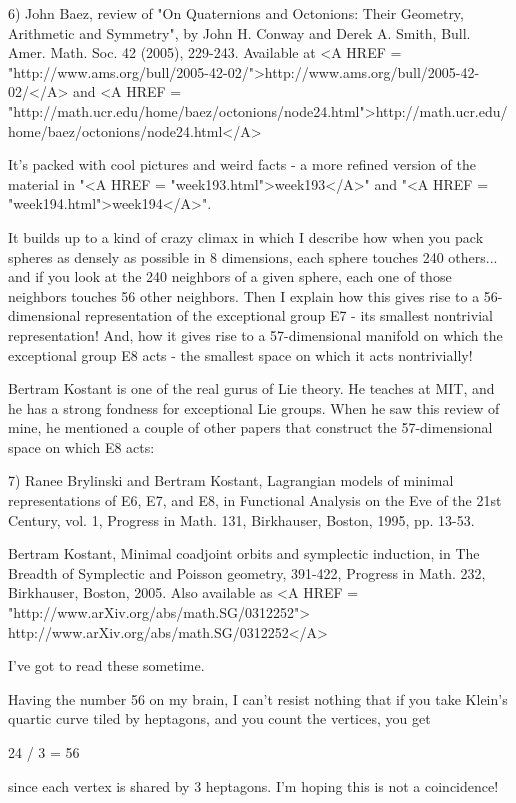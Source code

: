 6) John Baez, review of "On Quaternions and Octonions: Their Geometry,
Arithmetic and Symmetry", by John H. Conway and Derek A. Smith,
Bull. Amer. Math. Soc. 42 (2005), 229-243.  Available at 
<A HREF = "http://www.ams.org/bull/2005-42-02/">http://www.ams.org/bull/2005-42-02/</A> and 
<A HREF = "http://math.ucr.edu/home/baez/octonions/node24.html">http://math.ucr.edu/home/baez/octonions/node24.html</A>

It's packed with cool pictures and weird facts - a more refined
version of the material in "<A HREF = "week193.html">week193</A>" and "<A HREF = "week194.html">week194</A>".  

It builds up to a kind of crazy climax in which I describe how when you 
pack spheres as densely as possible in 8 dimensions, each sphere touches 
240 others... and if you look at the 240 neighbors of a given sphere, each 
one of those neighbors touches 56 other neighbors.  Then I explain how this 
gives rise to a 56-dimensional representation of the exceptional group E7 -
its smallest nontrivial representation!  And, how it
gives rise to a 57-dimensional manifold on which the exceptional group E8 
acts - the smallest space on which it acts nontrivially!   

Bertram Kostant is one of the real gurus of Lie theory.  He teaches at
MIT, and he has a strong fondness for exceptional Lie groups.  When he saw 
this review of mine, he mentioned a couple of other papers that construct 
the 57-dimensional space on which E8 acts:

7) Ranee Brylinski and Bertram Kostant, Lagrangian models of minimal
representations of E6, E7, and E8, in Functional Analysis on the Eve
of the 21st Century, vol. 1, Progress in Math. 131, Birkhauser, Boston, 
1995, pp. 13-53.

Bertram Kostant, Minimal coadjoint orbits and symplectic induction,
in The Breadth of Symplectic and Poisson geometry, 391-422, 
Progress in Math. 232, Birkhauser, Boston, 2005.  Also
available as <A HREF = "http://www.arXiv.org/abs/math.SG/0312252">
http://www.arXiv.org/abs/math.SG/0312252</A>

I've got to read these sometime.

Having the number 56 on my brain, I can't resist nothing that if
you take Klein's quartic curve tiled by heptagons, and you count 
the vertices, you get 

24  / 3 = 56

since each vertex is shared by 3 heptagons.  I'm hoping this is
not a coincidence!  

